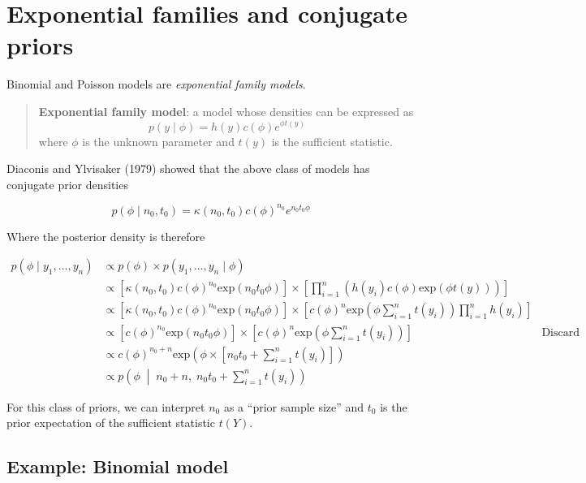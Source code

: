 \documentclass[
]{article}
\begin{document}
\hypertarget{exponential-families-and-conjugate-priors}{%
\section{Exponential families and conjugate
priors}\label{exponential-families-and-conjugate-priors}}

Binomial and Poisson models are \emph{exponential family models}.

\begin{quote}
\textbf{Exponential family model}: a model whose densities can be
expressed as \[p(y \mid \phi) = h(y)c(\phi)e^{\phi t(y)}\] where
\(\phi\) is the unknown parameter and \(t(y)\) is the sufficient
statistic.
\end{quote}

Diaconis and Ylvisaker (1979) showed that the above class of models has
conjugate prior densities

\[p(\phi \mid n_0, t_0) = \kappa (n_0, t_0) c(\phi)^{n_0} e^{n_0 t_0 \phi}\]

Where the posterior density is therefore

\begin{align}
p(\phi \mid y_1, \dots, y_n) &\propto p(\phi) \times p(y_1, \dots, y_n \mid \phi) \\

&\propto \left[ \kappa (n_0, t_0) c(\phi)^{n_0} \text{exp}(n_0 t_0 \phi) \right] \times \left[ \prod_{i = 1}^n \left( h(y_i) c(\phi) \text{exp}(\phi t(y)) \right) \right] \\
&\propto \left[ \kappa (n_0, t_0) c(\phi)^{n_0} \text{exp}(n_0 t_0 \phi) \right] \times \left[ c(\phi)^n \text{exp}\left(\phi \sum_{i = 1}^n t(y_i)\right) \prod_{i = 1}^n h(y_i) \right] \\
&\propto \left[ c(\phi)^{n_0} \text{exp}(n_0 t_0 \phi) \right] \times \left[ c(\phi)^n \text{exp}\left(\phi \sum_{i = 1}^n t(y_i)\right) \right] & \text{Discard constants} \\
&\propto c(\phi)^{n_0 + n} \text{exp}\left(\phi \times \left[n_0 t_0 + \sum_{i = 1}^n t(y_i) \right] \right) \\
&\propto p\left( \phi \; \middle| \; n_0 + n, \; n_0 t_0 + \sum_{i = 1}^n t(y_i) \right)
\end{align}

For this class of priors, we can interpret \(n_0\) as a ``prior sample
size'' and \(t_0\) is the prior expectation of the sufficient statistic
\(t(Y)\).

\hypertarget{example-binomial-model}{%
\subsection{Example: Binomial model}\label{example-binomial-model}}
\end{document}
